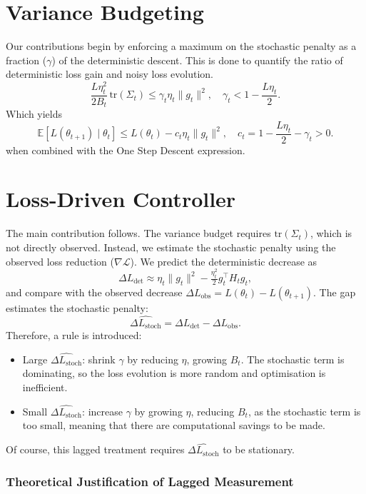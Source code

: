 \documentclass[12pt]{article}
\begin{document}
\section{Variance Budgeting}
Our contributions begin by enforcing a maximum on the stochastic penalty as a fraction ($\gamma$) of the deterministic descent. This is done to quantify the ratio of deterministic loss gain and noisy loss evolution.
\begin{equation}
\label{eq:budget}
    \frac{L\eta_t^2}{2B_t}\,\mathrm{tr}(\Sigma_t) \le \gamma_t \eta_t \|g_t\|^2,
    \quad 
    \gamma_t < 1 - \frac{L\eta_t}{2}.
\end{equation}
Which yields 
\[
    \mathbb{E}[L(\theta_{t+1}) \mid \theta_t]
    \le L(\theta_t) - c_t \eta_t \|g_t\|^2,
    \quad
    c_t = 1 - \frac{L\eta_t}{2} - \gamma_t > 0.
\]
when combined with the One Step Descent expression.

\section{Loss-Driven Controller}
The main contribution follows. The variance budget requires $\mathrm{tr}(\Sigma_t)$, which is not directly observed. Instead, we estimate the stochastic penalty using the observed loss reduction ($\nabla \mathcal{L}$). We predict the deterministic decrease as 
\[
\Delta L_{\text{det}} \approx \eta_t\|g_t\|^2 - \tfrac{\eta_t^2}{2} g_t^\top H_t g_t,
\]
and compare with the observed decrease $\Delta L_{\text{obs}} = L(\theta_t)-L(\theta_{t+1})$. The gap estimates the stochastic penalty:
\[
\widehat{\Delta L_{\text{stoch}}} = \Delta L_{\text{det}} - \Delta L_{\text{obs}}.
\]
Therefore, a rule is introduced:
\begin{itemize}
    \item Large $\widehat{\Delta L_{\text{stoch}}}$: shrink $\gamma$ by reducing $\eta$, growing $B_t$. The stochastic term is dominating, so the loss evolution is more random and optimisation is inefficient.
    \item Small $\widehat{\Delta L_{\text{stoch}}}$: increase $\gamma$ by growing $\eta$, reducing $B_t$, as the stochastic term is too small, meaning that there are computational savings to be made.
\end{itemize}
Of course, this lagged treatment requires $\widehat{\Delta L_{\text{stoch}}}$ to be stationary.

\subsubsection{Theoretical Justification of Lagged Measurement}
\end{document}
